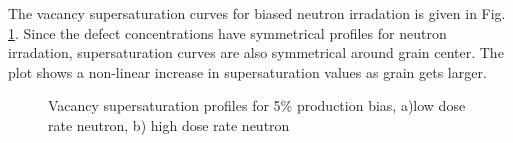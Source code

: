 \documentclass[a4paper]{article}
\begin{document}
    The vacancy supersaturation curves for biased neutron irradation is given in Fig. \ref{figure:vacancy_supersaturation_neutron_5}. Since the defect concentrations have symmetrical profiles for neutron irradation, supersaturation curves are also symmetrical around grain center. The plot shows a non-linear increase in supersaturation values as grain gets larger.
      \begin{figure}[h!]  %
        \centering
        \qquad
        \caption{Vacancy supersaturation profiles for 5\% production bias, a)low dose rate neutron, b) high dose rate neutron}
        \label{figure:vacancy_supersaturation_neutron_5}
      \end{figure}
\end{document}
